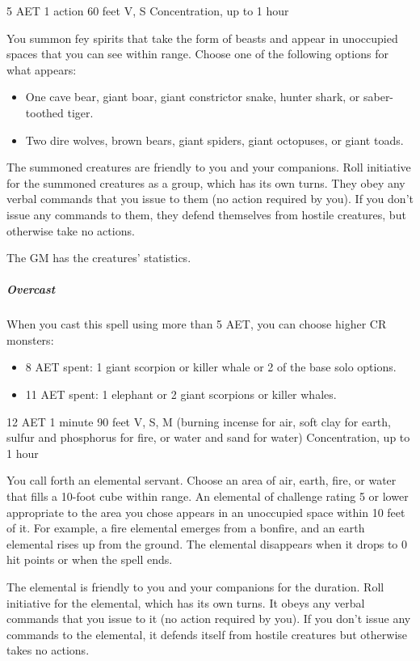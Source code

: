 {5 AET}
{1 action}
{60 feet}
{V, S}
{Concentration, up to 1 hour}

You summon fey spirits that take the form of beasts and appear in unoccupied spaces that you can see within range. Choose one of the following options for what appears:

\begin{itemize}
\item One cave bear, giant boar, giant constrictor snake, hunter shark, or saber-toothed tiger.
\item Two dire wolves, brown bears, giant spiders, giant octopuses, or giant toads.
\end{itemize}

The summoned creatures are friendly to you and your companions. Roll initiative for the summoned creatures as a group, which has its own turns. They obey any verbal commands that you issue to them (no action required by you). If you don't issue any commands to them, they defend themselves from hostile creatures, but otherwise take no actions.

The GM has the creatures' statistics.

\subparagraph*{Overcast} When you cast this spell using more than 5 AET, you can choose higher CR monsters:
\begin{itemize}
\item 8 AET spent: 1 giant scorpion or killer whale or 2 of the base solo options.
\item 11 AET spent: 1 elephant or 2 giant scorpions or killer whales.
\end{itemize}


{12 AET}
{1 minute}
{90 feet}
{V, S, M (burning incense for air, soft clay for earth, sulfur and phosphorus for fire, or water and sand for water)}
{Concentration, up to 1 hour}

You call forth an elemental servant. Choose an area of air, earth, fire, or water that fills a 10-foot cube within range. An elemental of challenge rating 5 or lower appropriate to the area you chose appears in an unoccupied space within 10 feet of it. For example, a fire elemental emerges from a bonfire, and an earth elemental rises up from the ground. The elemental disappears when it drops to 0 hit points or when the spell ends.

The elemental is friendly to you and your companions for the duration. Roll initiative for the elemental, which has its own turns. It obeys any verbal commands that you issue to it (no action required by you). If you don't issue any commands to the elemental, it defends itself from hostile creatures but otherwise takes no actions.

